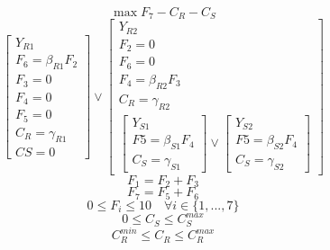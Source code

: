 \documentclass{juliacon}
\begin{document}
\begin{equation}
    \label{eq:example_obj}
    \max F_7 - C_R - C_S
\end{equation}
\begin{equation}
    \label{eq:example_gdp}
    \begin{bmatrix}
        Y_{R1} \\
        F_6 = \beta_{R1} F_2 \\
        F_3 = 0 \\
        F_4 = 0 \\
        F_5 = 0 \\
        C_R = \gamma_{R1} \\
        CS = 0
    \end{bmatrix} \lor
    \begin{bmatrix}
        Y_{R2} \\
        F_2 = 0 \\
        F_6 = 0 \\
        F_4 = \beta_{R2} F_3 \\
        C_R = \gamma_{R2} \\
        \begin{bmatrix}
            Y_{S1} \\
            F5 = \beta_{S1} F_4 \\
            C_S = \gamma_{S1}
        \end{bmatrix} \lor
        \begin{bmatrix}
            Y_{S2} \\
            F5 = \beta_{S2} F_4 \\
            C_S = \gamma_{S2}
        \end{bmatrix}
    \end{bmatrix}
\end{equation}
\begin{equation}
    \label{eq:example_global}
    F_1 = F_2 + F_3
\end{equation}
\begin{equation}
    \label{eq:example_global1}
    F_7 = F_5 + F_6
\end{equation}
\begin{equation}
    \label{eq:example_var1}
    0 \leq F_i \leq 10 \quad \forall i \in \{1,...,7\}
\end{equation}
\begin{equation}
    \label{eq:example_var2}
    0 \leq C_S \leq C_S^{max}
\end{equation}
\begin{equation}
    \label{eq:example_var3}
    C_R^{min} \leq C_R \leq C_R^{max}
\end{equation}
\vskip 6pt
\end{document}
